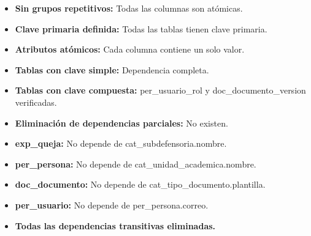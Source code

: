 \documentclass[12pt, a4paper]{article}
\begin{document}
\begin{tcolorbox}[title=Verificación 1FN - Atomicidad, colback=green!5!white]
    \begin{itemize}[leftmargin=*]
        \item \textbf{Sin grupos repetitivos:} Todas las columnas son atómicas.
        \item  \textbf{Clave primaria definida:} Todas las tablas tienen clave primaria.
        \item  \textbf{Atributos atómicos:} Cada columna contiene un solo valor.
    \end{itemize}
\end{tcolorbox}

\begin{tcolorbox}[title=Verificación 2FN - Dependencia Completa, colback=green!5!white]
    \begin{itemize}[leftmargin=*]
        \item \textbf{Tablas con clave simple:} Dependencia completa.
        \item  \textbf{Tablas con clave compuesta:} per\_usuario\_rol y doc\_documento\_version verificadas.
        \item  \textbf{Eliminación de dependencias parciales:} No existen.
    \end{itemize}
\end{tcolorbox}

\begin{tcolorbox}[title=Verificación 3FN - Dependencias Transitivas, colback=green!5!white]
    \begin{itemize}[leftmargin=*]
        \item  \textbf{exp\_queja:} No depende de cat\_subdefensoria.nombre.
        \item  \textbf{per\_persona:} No depende de cat\_unidad\_academica.nombre.
        \item  \textbf{doc\_documento:} No depende de cat\_tipo\_documento.plantilla.
        \item  \textbf{per\_usuario:} No depende de per\_persona.correo.
        \item  \textbf{Todas las dependencias transitivas eliminadas.}
    \end{itemize}
\end{tcolorbox}

\end{document}

